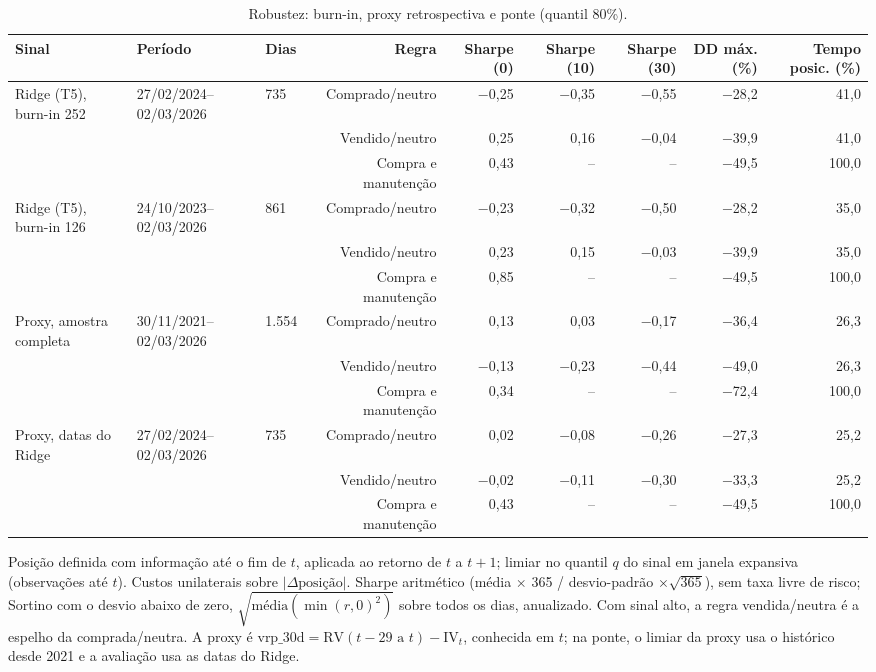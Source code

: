 \begin{table}[H]
\centering
\small
\caption{Robustez: burn-in, proxy retrospectiva e ponte (quantil 80\%).}
\label{tab:A1-robustez}
\begin{tabular}{lllrrrrrr}
\toprule
Sinal & Período & Dias & Regra & Sharpe (0) & Sharpe (10) & Sharpe (30) & DD máx. (\%) & Tempo posic. (\%) \\
\midrule
Ridge (T5), burn-in 252 & 27/02/2024--02/03/2026 & 735 & Comprado/neutro & $-$0{,}25 & $-$0{,}35 & $-$0{,}55 & $-$28{,}2 & 41{,}0 \\
 &  &  & Vendido/neutro & 0{,}25 & 0{,}16 & $-$0{,}04 & $-$39{,}9 & 41{,}0 \\
 &  &  & Compra e manutenção & 0{,}43 & -- & -- & $-$49{,}5 & 100{,}0 \\
\midrule
Ridge (T5), burn-in 126 & 24/10/2023--02/03/2026 & 861 & Comprado/neutro & $-$0{,}23 & $-$0{,}32 & $-$0{,}50 & $-$28{,}2 & 35{,}0 \\
 &  &  & Vendido/neutro & 0{,}23 & 0{,}15 & $-$0{,}03 & $-$39{,}9 & 35{,}0 \\
 &  &  & Compra e manutenção & 0{,}85 & -- & -- & $-$49{,}5 & 100{,}0 \\
\midrule
Proxy, amostra completa & 30/11/2021--02/03/2026 & 1.554 & Comprado/neutro & 0{,}13 & 0{,}03 & $-$0{,}17 & $-$36{,}4 & 26{,}3 \\
 &  &  & Vendido/neutro & $-$0{,}13 & $-$0{,}23 & $-$0{,}44 & $-$49{,}0 & 26{,}3 \\
 &  &  & Compra e manutenção & 0{,}34 & -- & -- & $-$72{,}4 & 100{,}0 \\
\midrule
Proxy, datas do Ridge & 27/02/2024--02/03/2026 & 735 & Comprado/neutro & 0{,}02 & $-$0{,}08 & $-$0{,}26 & $-$27{,}3 & 25{,}2 \\
 &  &  & Vendido/neutro & $-$0{,}02 & $-$0{,}11 & $-$0{,}30 & $-$33{,}3 & 25{,}2 \\
 &  &  & Compra e manutenção & 0{,}43 & -- & -- & $-$49{,}5 & 100{,}0 \\
\bottomrule
\end{tabular}

\par\smallskip\parbox{\linewidth}{\footnotesize Posição definida com informação até o fim de $t$, aplicada ao retorno de $t$ a $t+1$; limiar no quantil $q$ do sinal em janela expansiva (observações até $t$). Custos unilaterais sobre $|\Delta \text{posição}|$. Sharpe aritmético (média $\times$ 365 / desvio-padrão $\times \sqrt{365}$), sem taxa livre de risco; Sortino com o desvio abaixo de zero, $\sqrt{\text{média}(\min(r, 0)^2)}$ sobre todos os dias, anualizado. Com sinal alto, a regra vendida/neutra é a espelho da comprada/neutra. A proxy é $\text{vrp\_30d} = \text{RV}(t-29 \text{ a } t) - \text{IV}_t$, conhecida em $t$; na ponte, o limiar da proxy usa o histórico desde 2021 e a avaliação usa as datas do Ridge.}
\end{table}
